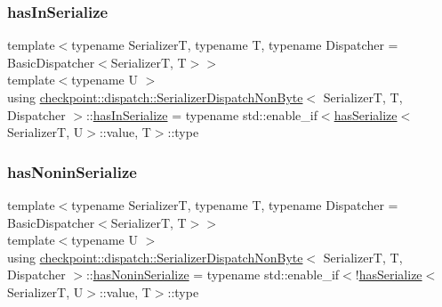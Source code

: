 \subsubsection{\texorpdfstring{has\+In\+Serialize}{hasInSerialize}}
{\footnotesize\ttfamily template$<$typename SerializerT, typename T, typename Dispatcher = Basic\+Dispatcher$<$\+Serializer\+T, T$>$$>$ \\
template$<$typename U $>$ \\
using \hyperlink{structcheckpoint_1_1dispatch_1_1_serializer_dispatch_non_byte}{checkpoint\+::dispatch\+::\+Serializer\+Dispatch\+Non\+Byte}$<$ SerializerT, T, Dispatcher $>$\+::\hyperlink{structcheckpoint_1_1dispatch_1_1_serializer_dispatch_non_byte_a7f2203710503e6ea7a5c4a565795a1d0}{has\+In\+Serialize} =  typename std\+::enable\+\_\+if$<$\hyperlink{structcheckpoint_1_1dispatch_1_1has_serialize}{has\+Serialize}$<$SerializerT, U$>$\+::value, T$>$\+::type}

\mbox{\label{structcheckpoint_1_1dispatch_1_1_serializer_dispatch_non_byte_ad59e5c933a762ce90d1ab5f7ca04ca9f}} 
\subsubsection{\texorpdfstring{has\+Nonin\+Serialize}{hasNoninSerialize}}
{\footnotesize\ttfamily template$<$typename SerializerT, typename T, typename Dispatcher = Basic\+Dispatcher$<$\+Serializer\+T, T$>$$>$ \\
template$<$typename U $>$ \\
using \hyperlink{structcheckpoint_1_1dispatch_1_1_serializer_dispatch_non_byte}{checkpoint\+::dispatch\+::\+Serializer\+Dispatch\+Non\+Byte}$<$ SerializerT, T, Dispatcher $>$\+::\hyperlink{structcheckpoint_1_1dispatch_1_1_serializer_dispatch_non_byte_ad59e5c933a762ce90d1ab5f7ca04ca9f}{has\+Nonin\+Serialize} =  typename std\+::enable\+\_\+if$<$!\hyperlink{structcheckpoint_1_1dispatch_1_1has_serialize}{has\+Serialize}$<$SerializerT, U$>$\+::value, T$>$\+::type}

\mbox{\label{structcheckpoint_1_1dispatch_1_1_serializer_dispatch_non_byte_a456d0c02fc35667989d79ddbb0393776}} 
